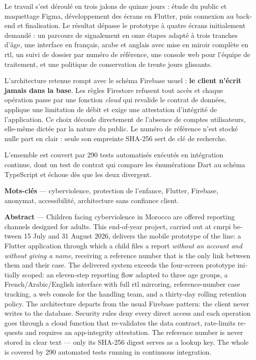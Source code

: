 \documentclass[11pt,a4paper,oneside,openany]{report}
\begin{document}
Le travail s'est déroulé en trois jalons de quinze jours : étude du public et
maquettage Figma, développement des écrans en Flutter, puis connexion au
back-end et finalisation. Le résultat dépasse le prototype à quatre écrans
initialement demandé : un parcours de signalement en onze étapes adapté à trois
tranches d'âge, une interface en français, arabe et anglais avec mise en miroir
complète en \gls{rtl}, un suivi de dossier par numéro de référence, une console
web pour l'équipe de traitement, et une politique de conservation de trente
jours glissants.

L'architecture retenue rompt avec le schéma Firebase usuel : \textbf{le client
n'écrit jamais dans la base}. Les règles Firestore refusent tout accès et chaque
opération passe par une fonction \emph{cloud} qui revalide le contrat de
données, applique une limitation de débit et exige une attestation d'intégrité
de l'application. Ce choix découle directement de l'absence de comptes
utilisateurs, elle-même dictée par la nature du public. Le numéro de référence
n'est stocké nulle part en clair : seule son empreinte SHA-256 sert de clé de
recherche.

L'ensemble est couvert par 290 tests automatisés exécutés en intégration
continue, dont un test de contrat qui compare les énumérations Dart au schéma
TypeScript et échoue dès que les deux divergent.

\vspace{3mm}
\noindent\textbf{Mots-clés} — cyberviolence, protection de l'enfance, Flutter,
Firebase, anonymat, accessibilité, architecture sans confiance client.

\vspace{6mm}
\noindent{\color{emcborder}\rule{\textwidth}{0.6pt}}
\vspace{4mm}

\begin{otherlanguage}{english}
\noindent\textbf{Abstract} — Children facing cyberviolence in Morocco are
offered reporting channels designed for adults. This end-of-year project,
carried out at \gls{cmrpi} between 15 July and 31 August 2026, delivers the
mobile prototype of the \emc line: a Flutter application through which a child
files a report \emph{without an account and without giving a name}, receiving a
reference number that is the only link between them and their case. The
delivered system exceeds the four-screen prototype initially scoped: an
eleven-step reporting flow adapted to three age groups, a French/Arabic/English
interface with full \gls{rtl} mirroring, reference-number case tracking, a web
console for the handling team, and a thirty-day rolling retention policy. The
architecture departs from the usual Firebase pattern: the client never writes to
the database. Security rules deny every direct access and each operation goes
through a cloud function that re-validates the data contract, rate-limits
requests and requires an app-integrity attestation. The reference number is
never stored in clear text — only its SHA-256 digest serves as a lookup key. The
whole is covered by 290 automated tests running in continuous integration.
\end{otherlanguage}
\end{document}
